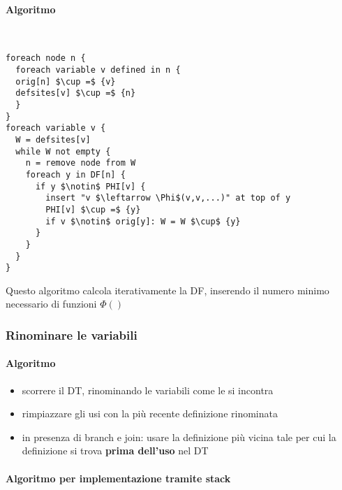 \paragraph{Algoritmo}~\\


\begin{lstlisting}[morekeywords={foreach,node,variable,in,remove,from,insert,defined}]
foreach node n {
  foreach variable v defined in n {
  orig[n] $\cup =$ {v}
  defsites[v] $\cup =$ {n}
  }
}
foreach variable v {
  W = defsites[v]
  while W not empty {
    n = remove node from W
    foreach y in DF[n] {
      if y $\notin$ PHI[v] {
        insert "v $\leftarrow \Phi$(v,v,...)" at top of y
        PHI[v] $\cup =$ {y}
        if v $\notin$ orig[y]: W = W $\cup$ {y}
      }
    }
  }
}\end{lstlisting}

Questo algoritmo calcola iterativamente la DF, inserendo il numero minimo necessario di funzioni $\Phi()$

\subsubsection{Rinominare le variabili}

\paragraph{Algoritmo}

\begin{itemize}
  \item scorrere il DT, rinominando le variabili come le si incontra
  \item rimpiazzare gli usi con la pi\`u recente definizione rinominata
  \item in presenza di branch e join: usare la definizione pi\`u vicina tale per cui la definizione si trova \textbf{prima dell'uso} nel DT
\end{itemize}

\paragraph{Algoritmo per implementazione tramite stack}~\\

